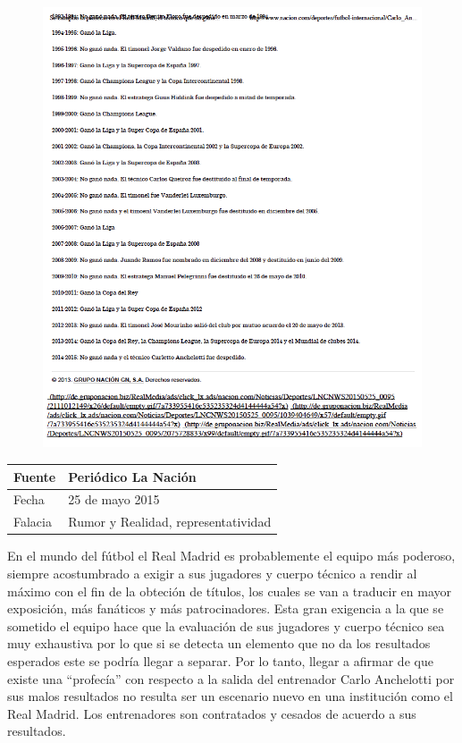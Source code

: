 \documentclass[times]{simauth}
\begin{document}
\begin{figure}[h!]
    \centering
    \includegraphics[width=16cm]{anchelotti-2}
    \label{fig:falacia6-2}
\end{figure}

\newpage
\begin{table}[h!]
    \begin{tabular}{ll} 
        \toprule[1.5pt]
        Fuente & Periódico La Nación\\
        \midrule[0.5pt]
        Fecha  & 25 de mayo 2015\\
        \midrule[0.5pt]
        Falacia & Rumor y Realidad, representatividad \\
        \bottomrule[1.5pt]
    \end{tabular} 
\end{table}

En el mundo del fútbol el Real Madrid es probablemente el equipo más poderoso, siempre acostumbrado a exigir a sus jugadores y cuerpo técnico a rendir al máximo con el fin de la obteción de títulos, los cuales se van a traducir en mayor exposición, más fanáticos y más patrocinadores.
Esta gran exigencia a la que se sometido el equipo hace que la evaluación de sus jugadores y cuerpo técnico sea muy exhaustiva por lo que si se detecta un elemento que no da los resultados esperados este se podría llegar a separar. Por lo tanto, llegar a afirmar de que existe una ``profecía'' con respecto a la salida del entrenador Carlo Anchelotti por sus malos resultados no resulta ser un escenario nuevo en una institución como el Real Madrid. Los entrenadores son contratados y cesados de acuerdo a sus resultados.
\end{document}
